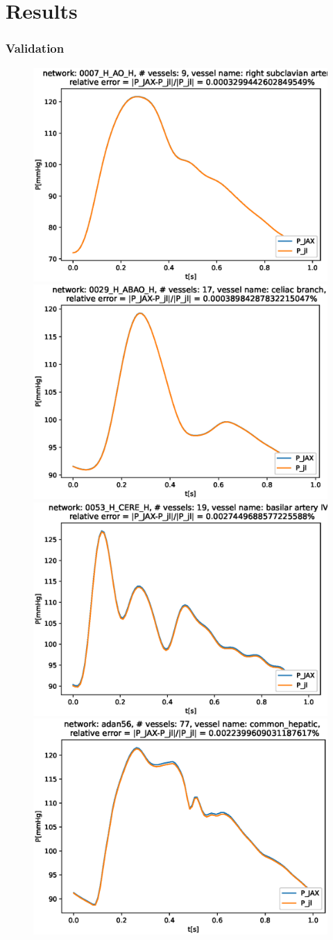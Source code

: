 \documentclass{beamer}
\begin{document}
\section{Results}
\begin{frame}
	\frametitle{Validation}
	\begin{figure} [H]
		\centering
		\includegraphics[width=0.46\columnwidth]{images/0007_H_AO_H_right_subclavian_artery_P.eps}
		\includegraphics[width=0.46\columnwidth]{images/0029_H_ABAO_H_celiac_branch_P.eps
		}
		\includegraphics[width=0.46\columnwidth]{images/0053_H_CERE_H_basilar_artery_IV_P.eps}
		\includegraphics[width=0.46\columnwidth]{images/adan56_common_hepatic_P.eps}
		\label{fig:val}
	\end{figure}
\end{frame}
\end{document}
